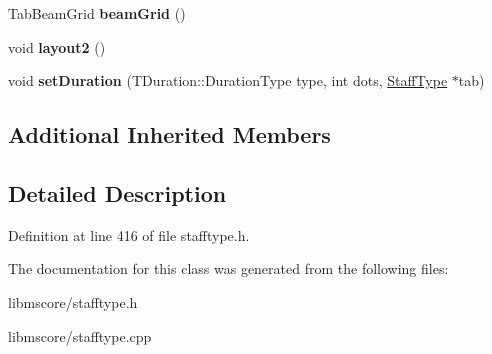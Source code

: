 \begin{DoxyCompactItemize}
\item 
\mbox{\label{class_ms_1_1_tab_duration_symbol_a4ea6fa2b5208bbe8577af9eb5d7559c3}} 
Tab\+Beam\+Grid {\bfseries beam\+Grid} ()
\item 
\mbox{\label{class_ms_1_1_tab_duration_symbol_a038aa9b1d1c0373fca0325d9528d7347}} 
void {\bfseries layout2} ()
\item 
\mbox{\label{class_ms_1_1_tab_duration_symbol_a676ad1e81111db262ddc09498efd05d6}} 
void {\bfseries set\+Duration} (T\+Duration\+::\+Duration\+Type type, int dots, \hyperlink{class_ms_1_1_staff_type}{Staff\+Type} $\ast$tab)
\end{DoxyCompactItemize}
\subsection*{Additional Inherited Members}


\subsection{Detailed Description}


Definition at line 416 of file stafftype.\+h.



The documentation for this class was generated from the following files\+:\begin{DoxyCompactItemize}
\item 
libmscore/stafftype.\+h\item 
libmscore/stafftype.\+cpp\end{DoxyCompactItemize}
